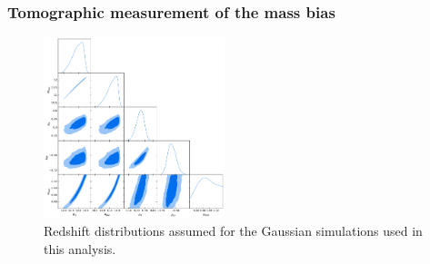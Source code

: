 \documentclass[useAMS,usenatbib]{mn2e}
\begin{document}
    \subsubsection{Tomographic measurement of the mass bias}\label{ssec:results.fid.1mb}
      \begin{figure}
        \centering
        \includegraphics[width=0.47\textwidth]{fiducial_wisc3.pdf}
        \caption{Redshift distributions assumed for the Gaussian simulations used in this analysis.}
        \label{fig:triangle}
      \end{figure}
\end{document}
